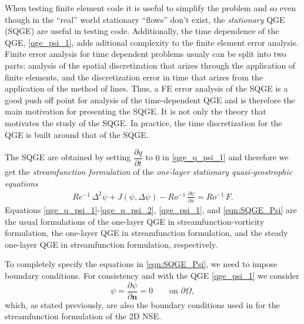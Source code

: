 When testing finite element code it is useful to simplify the problem and so
even though in the ``real'' world stationary ``flows'' don't exist, the
\emph{stationary} QGE (SQGE) are useful in testing code.  Additionally, the time
dependence of the QGE, \eqref{qge_psi_1}, adds aditional complexity to the
finite element error analysis. Finite error analysis for time dependent problems
usualy can be split into two parts; analysis of the spatial discretization that
arizes through the application of finite elements, and the discretization error
in time that arizes from the application of the method of lines. Thus, a FE
error analysis of the SQGE is a good push off point for analysis of the
time-dependent QGE and is therefore the main motivation for presenting the SQGE.
It is not only the theory that motivates the study of the SQGE. In practice, the
time discretization for the QGE is built around that of the SQGE.

The SQGE are obtained by setting $\dfrac{\partial q}{\partial t}$ to $0$ in
\eqref{qge_q_psi_1} and therefore we get the \emph{streamfunction formulation}
of the \emph{one-layer stationary quasi-geostrophic equations}
\begin{eqnarray}
  Re^{-1} \, \Delta^2 \psi + J(\psi , \Delta \psi) - Ro^{-1} \, \frac{\partial
    \psi}{\partial x} = Ro^{-1} \, F .
  \label{eqn:SQGE_Psi}
\end{eqnarray}
Equations \eqref{qge_q_psi_1}-\eqref{qge_q_psi_2}, \eqref{qge_psi_1}, and
\eqref{eqn:SQGE_Psi} are the usual formulations of the one-layer QGE in
streamfunction-vorticity formulation, the one-layer QGE in streamfunction
formulation, and the steady one-layer QGE in streamfunction formulation,
respectively.

To completely specify the equations in \eqref{eqn:SQGE_Psi}, we need to impose
boundary conditions. For consistency and with the QGE \eqref{qge_psi_1}  we
consider
\begin{equation*}
  \psi = \frac{\partial \psi}{\partial \mathbf{n}} = 0 \qquad \text{on } \partial \Omega,
\end{equation*}
which, as stated previously, are also the boundary conditions used in
\cite{Gunzburger89} for the streamfunction formulation of the 2D NSE.

